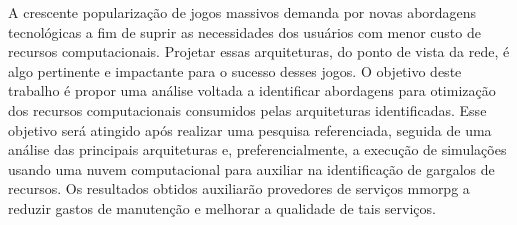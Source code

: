 A crescente popularização de jogos massivos demanda por novas abordagens tecnológicas a fim de suprir as necessidades dos usuários com menor custo de recursos computacionais.
%
Projetar essas arquiteturas, do ponto de vista da rede, é algo pertinente e impactante para o sucesso desses jogos.
%
O objetivo deste trabalho é propor uma análise voltada a identificar abordagens para otimização dos recursos computacionais consumidos pelas arquiteturas identificadas.
%
Esse objetivo será atingido após realizar uma pesquisa referenciada, seguida de uma análise das principais arquiteturas e, preferencialmente, a execução de simulações usando uma nuvem computacional para auxiliar na identificação de gargalos de recursos. Os resultados obtidos auxiliarão provedores de serviços \ac{mmorpg} a reduzir gastos de manutenção e melhorar a qualidade de tais serviços.
